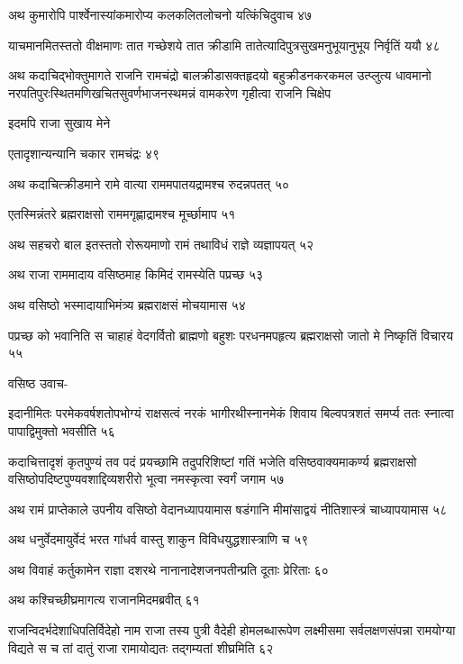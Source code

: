 अथ कुमारोपि पार्श्वेनास्यांकमारोप्य कलकलितलोचनो यत्किंचिदुवाच ४७

याचमानमितस्ततो वीक्षमाणः तात गच्छेशये तात क्रीडामि तातेत्यादिपुत्रसुखमनुभूयानुभूय
निर्वृतिं ययौ ४८

अथ कदाचिद्भोक्तुमागते राजनि रामचंद्रो बालक्रीडासक्तहृदयो बहुक्रीडनकरकमल उत्प्लुत्य
धावमानो नरपतिपुरःस्थितमणिखचितसुवर्णभाजनस्थमन्नं वामकरेण गृहीत्वा राजनि चिक्षेप

इदमपि राजा सुखाय मेने

एतादृशान्यन्यानि चकार रामचंद्रः ४९

अथ कदाचित्क्रीडमाने रामे वात्या राममपातयद्रामश्च रुदन्नपतत् ५०

एतस्मिन्नंतरे ब्रह्मराक्षसो राममगृह्णाद्रामश्च मूर्च्छामाप ५१

अथ सहचरो बाल इतस्ततो रोरूयमाणो रामं तथाविधं राज्ञे व्यज्ञापयत् ५२

अथ राजा राममादाय वसिष्ठमाह किमिदं रामस्येति पप्रच्छ ५३

अथ वसिष्ठो भस्मादायाभिमंत्र्य ब्रह्मराक्षसं मोचयामास ५४

पप्रच्छ को भवानिति स चाहाहं वेदगर्वितो ब्राह्मणो बहुशः परधनमपहृत्य ब्रह्मराक्षसो जातो
मे निष्कृतिं विचारय ५५

वसिष्ठ उवाच-

इदानीमितः परमेकवर्षशतोपभोग्यं राक्षसत्वं नरकं भागीरथीस्नानमेकं शिवाय बिल्वपत्रशतं
समर्प्य ततः स्नात्वा पापाद्विमुक्तो भवसीति ५६

कदाचित्तादृशं कृतपुण्यं तव पदं प्रयच्छामि तदुपरिशिष्टां गतिं भजेति वसिष्ठवाक्यमाकर्ण्य
ब्रह्मराक्षसो वसिष्ठोपदिष्टपुण्यवशाद्दिव्यशरीरो भूत्वा नमस्कृत्वा स्वर्गं जगाम ५७

अथ रामं प्राप्तेकाले उपनीय वसिष्ठो वेदानध्यापयामास षडंगानि मीमांसाद्वयं नीतिशास्त्रं
चाध्यापयामास ५८

अथ धनुर्वेदमायुर्वेदं भरत गांधर्व वास्तु शाकुन विविधयुद्धशास्त्राणि च ५९

अथ विवाहं कर्तुकामेन राज्ञा दशरथे नानानादेशजनपतीन्प्रति दूताः प्रेरिताः ६०

अथ कश्चिच्छीघ्रमागत्य राजानमिदमब्रवीत् ६१

राजन्विदर्भदेशाधिपतिर्विदेहो नाम राजा तस्य पुत्री वैदेही होमलब्धारूपेण लक्ष्मीसमा
सर्वलक्षणसंपन्ना रामयोग्या विद्यते स च तां दातुं राजा रामायोद्यतः तद्गम्यतां शीघ्रमिति
 ६२

